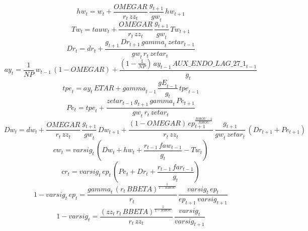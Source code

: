 \begin{dmath}
{hw}_{t}={w}_{t}+\frac{{OMEGAR}}{{r}_{t}\, {zz}_{t}}\, \frac{{g}_{t+1}}{{gw}_{t}}\, {hw}_{t+1}
\end{dmath}
\begin{dmath}
{Tw}_{t}={tauw}_{t}+\frac{{OMEGAR}}{{r}_{t}\, {zz}_{t}}\, \frac{{g}_{t+1}}{{gw}_{t}}\, {Tw}_{t+1}
\end{dmath}
\begin{dmath}
{Dr}_{t}={dr}_{t}+\frac{{g}_{t+1}\, {Dr}_{t+1}\, {gamma}_{t}\, {zetar}_{t-1}}{{gw}_{t}\, {r}_{t}\, {zetar}_{t}}
\end{dmath}
\begin{dmath}
{ay}_{t}=\frac{1}{{NP}}\, {w}_{t-1}\, \left(1-{OMEGAR}\right)+\frac{\left(1-\frac{1}{{NP}}\right)\, {ay}_{t-1}\, {AUX\_ENDO\_LAG\_27\_1}_{t-1}}{{g}_{t}}
\end{dmath}
\begin{dmath}
{tpe}_{t}={ay}_{t}\, {ETAR}+{gamma}_{t-1}\, \frac{{gE}_{t-1}}{{g}_{t}}\, {tpe}_{t-1}
\end{dmath}
\begin{dmath}
{Pe}_{t}={tpe}_{t}+\frac{{zetar}_{t-1}\, {g}_{t+1}\, {gamma}_{t}\, {Pe}_{t+1}}{{gw}_{t}\, {r}_{t}\, {zetar}_{t}}
\end{dmath}
\begin{dmath}
{Dw}_{t}={dw}_{t}+\frac{{OMEGAR}}{{r}_{t}\, {zz}_{t}}\, \frac{{g}_{t+1}}{{gw}_{t}}\, {Dw}_{t+1}+\frac{\left(1-{OMEGAR}\right)\, {ep}_{t+1}^{\frac{{RHOU}-1}{{RHOU}}}}{{r}_{t}\, {zz}_{t}}\, \frac{{g}_{t+1}}{{gw}_{t}\, {zetar}_{t}}\, \left({Dr}_{t+1}+{Pe}_{t+1}\right)
\end{dmath}
\begin{dmath}
{cw}_{t}={varsig}_{t}\, \left({Dw}_{t}+{hw}_{t}+\frac{{r}_{t-1}\, {faw}_{t-1}}{{g}_{t}}-{Tw}_{t}\right)
\end{dmath}
\begin{dmath}
{cr}_{t}={varsig}_{t}\, {ep}_{t}\, \left({Pe}_{t}+{Dr}_{t}+\frac{{r}_{t-1}\, {far}_{t-1}}{{g}_{t}}\right)
\end{dmath}
\begin{dmath}
1-{varsig}_{t}\, {ep}_{t}=\frac{{gamma}_{t}\, \left({r}_{t}\, {BBETA}\right)^{\frac{1}{1-{RHOU}}}}{{r}_{t}}\, \frac{{varsig}_{t}\, {ep}_{t}}{{ep}_{t+1}\, {varsig}_{t+1}}
\end{dmath}
\begin{dmath}
1-{varsig}_{t}=\frac{\left({zz}_{t}\, {r}_{t}\, {BBETA}\right)^{\frac{1}{1-{RHOU}}}}{{r}_{t}\, {zz}_{t}}\, \frac{{varsig}_{t}}{{varsig}_{t+1}}
\end{dmath}
